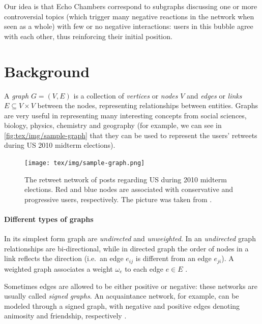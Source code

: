 Our idea is that Echo Chambers correspond to subgraphs discussing one or more
controversial topics (which trigger many negative reactions in the network when
seen as a whole) with few or no negative interactions: users in this bubble
agree with each other, thus reinforcing their initial position.

\section{Background}
\label{sec:background}

A \emph{graph} $G = (V, E)$ is a collection of \emph{vertices} or \emph{nodes} $V$ and
\emph{edges} or \emph{links} $E \subseteq V \times V$ between the nodes, representing relationships
between entities. Graphs are very useful in
representing many interesting concepts from social sciences, biology, physics,
chemistry and geography (for example, we can see in
\autoref{fig:tex/img/sample-graph} that they
can be used to represent the users' retweets during US 2010 midterm
elections)\cite{Newman2018,Menczer2020}.

\begin{figure}
	\centering
	\texttt{[image: tex/img/sample-graph.png]}
	\caption[Retweet network during 2010 midterm elections]{The retweet network of posts regarding US during 2010 midterm
		elections. Red and blue nodes are associated with conservative and
		progressive users, respectively. The picture was taken from
		\cite{Menczer2020}.}
	\label{fig:tex/img/sample-graph}
\end{figure}

\paragraph{Different types of graphs}%
\label{par:different_types_of_graphs}

In its simplest form graph are \emph{undirected} and \emph{unweighted}. In an
\emph{undirected} graph relationships are bi-directional, while in directed graph
the order of nodes in a link reflects the
direction (i.e.\ an edge $e_{ij} $ is different from an edge $e_{ji} $). A weighted
graph associates a weight $\omega _e$ to each edge $e \in E$
\cite{Menczer2020,AlbertLaszloNortheasternUniversity2016}.

Sometimes edges are allowed to be either positive or negative: these networks
are usually called \emph{signed graphs}. An acquaintance
network, for example, can be modeled through a signed graph, with negative and
positive edges denoting animosity and friendship, respectively \cite{Newman2018}.

